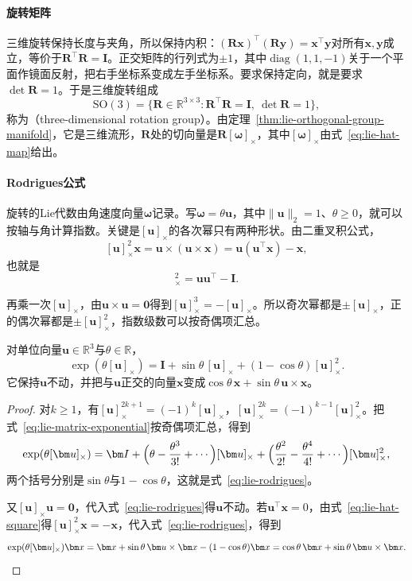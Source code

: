 \paragraph{旋转矩阵}
三维旋转保持长度与夹角，所以保持内积：$(\bm R\bm x)^\top(\bm R\bm y)=\bm x^\top\bm y$对所有$\bm x,\bm y$成立，等价于$\bm R^\top\bm R=\bm I$。正交矩阵的行列式为$\pm1$，其中$\operatorname{diag}(1,1,-1)$关于一个平面作镜面反射，把右手坐标系变成左手坐标系。要求保持定向，就是要求$\det\bm R=1$。于是三维旋转组成
\[
\mathrm{SO}(3)=\{\bm R\in\mathbb R^{3\times3}:\bm R^\top\bm R=\bm I,\ \det\bm R=1\},
\]
称为（three-dimensional rotation group）。由定理~\ref{thm:lie-orthogonal-group-manifold}，它是三维流形，$\bm R$处的切向量是$\bm R[\bm\omega]_\times$，其中$[\bm\omega]_\times$由式~\eqref{eq:lie-hat-map}给出。

\paragraph{Rodrigues公式}
旋转的Lie代数由角速度向量$\bm\omega$记录。写$\bm\omega=\theta\bm u$，其中$\lVert\bm u\rVert_2=1$、$\theta\geq0$，就可以按轴与角计算指数。关键是$[\bm u]_\times$的各次幂只有两种形状。由二重叉积公式，
\[
[\bm u]_\times^2\bm x=\bm u\times(\bm u\times\bm x)=\bm u(\bm u^\top\bm x)-\bm x,
\]
也就是
\begin{equation}
 [\bm u]_\times^2=\bm u\bm u^\top-\bm I.
 \label{eq:lie-hat-square}
\end{equation}

再乘一次$[\bm u]_\times$，由$\bm u\times\bm u=\bm0$得到$[\bm u]_\times^3=-[\bm u]_\times$。所以奇次幂都是$\pm[\bm u]_\times$，正的偶次幂都是$\pm[\bm u]_\times^2$，指数级数可以按奇偶项汇总。

\begin{theorem}[Rodrigues公式]
\label{thm:lie-rodrigues}
对单位向量$\bm u\in\mathbb R^3$与$\theta\in\mathbb R$，
\begin{equation}
 \exp(\theta[\bm u]_\times)=\bm I+\sin\theta\,[\bm u]_\times+(1-\cos\theta)[\bm u]_\times^2.
 \label{eq:lie-rodrigues}
\end{equation}
它保持$\bm u$不动，并把与$\bm u$正交的向量$\bm x$变成$\cos\theta\,\bm x+\sin\theta\,\bm u\times\bm x$。
\end{theorem}

\begin{proof}
对$k\geq1$，有$[\bm u]_\times^{2k+1}=(-1)^k[\bm u]_\times$，$[\bm u]_\times^{2k}=(-1)^{k-1}[\bm u]_\times^2$。把式~\eqref{eq:lie-matrix-exponential}按奇偶项汇总，得到
\[
\exp(\theta[\bm u]_\times)=\bm I
+\Bigl(\theta-\frac{\theta^3}{3!}+\cdots\Bigr)[\bm u]_\times
+\Bigl(\frac{\theta^2}{2!}-\frac{\theta^4}{4!}+\cdots\Bigr)[\bm u]_\times^2,
\]
两个括号分别是$\sin\theta$与$1-\cos\theta$，这就是式~\eqref{eq:lie-rodrigues}。

又$[\bm u]_\times\bm u=\bm0$，代入式~\eqref{eq:lie-rodrigues}得$\bm u$不动。若$\bm u^\top\bm x=0$，由式~\eqref{eq:lie-hat-square}得$[\bm u]_\times^2\bm x=-\bm x$，代入式~\eqref{eq:lie-rodrigues}，得到
\[
\exp(\theta[\bm u]_\times)\bm x
=\bm x+\sin\theta\,\bm u\times\bm x-(1-\cos\theta)\bm x
=\cos\theta\,\bm x+\sin\theta\,\bm u\times\bm x.\qedhere
\]
\end{proof}

